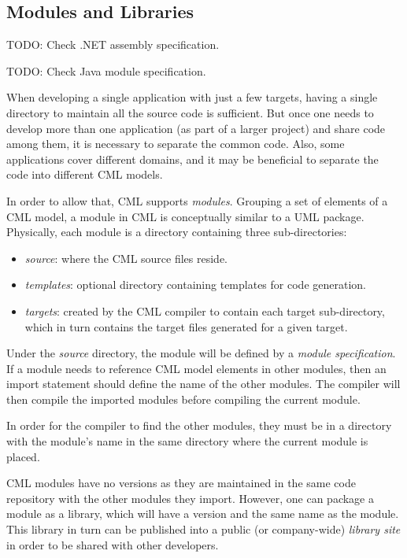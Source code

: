\subsection{Modules and Libraries}\label{subsec:modlib}

TODO: Check .NET assembly specification.

TODO: Check Java module specification.

When developing a single application with just a few targets, having a single directory to maintain all the source code is sufficient. But once one needs to develop more than one application (as part of a larger project) and share code among them, it is necessary to separate the common code. Also, some applications cover different domains, and it may be beneficial to separate the code into different CML models.

In order to allow that, CML supports \emph{modules}. Grouping a set of elements of a CML model, a module in CML is conceptually similar to a UML \cite{uml} package. Physically, each module is a directory containing three sub-directories:

\begin{itemize}
\item \emph{source}: where the CML source files reside.
\item \emph{templates}: optional directory containing templates for code generation.
\item \emph{targets}: created by the CML compiler to contain each target sub-directory, which in turn contains the target files generated for a given target.
\end{itemize}

Under the \emph{source} directory, the module will be defined by a \emph{module specification}. If a module needs to reference CML model elements in other modules, then an import statement should define the name of the other modules. The compiler will then compile the imported modules before compiling the current module.

In order for the compiler to find the other modules, they must be in a directory with the module's name in the same directory where the current module is placed.

CML modules have no versions as they are maintained in the same code repository with the other modules they import. However, one can package a module as a library, which will have a version and the same name as the module. This library in turn can be published into a public (or company-wide) \emph{library site} in order to be shared with other developers.


